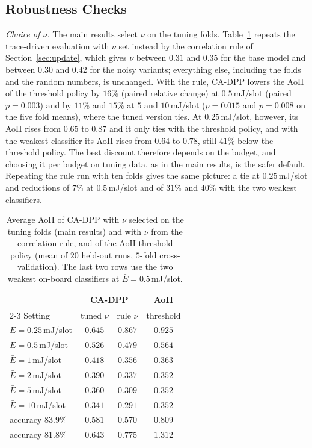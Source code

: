 \documentclass[5p,twocolumn]{elsarticle}
\theoremstyle{remark}
\begin{document}
\subsection{Robustness Checks}\label{res:robust}
\emph{Choice of $\nu$.} The main results select $\nu$ on the tuning folds. Table~\ref{tab:nu} repeats the trace-driven evaluation with $\nu$ set instead by the correlation rule of Section~\ref{sec:update}, which gives $\nu$ between $0.31$ and $0.35$ for the base model and between $0.30$ and $0.42$ for the noisy variants; everything else, including the folds and the random numbers, is unchanged. With the rule, CA-DPP lowers the AoII of the threshold policy by $16\%$ (paired relative change) at $0.5$\,mJ/slot (paired $p=0.003$) and by $11\%$ and $15\%$ at $5$ and $10$\,mJ/slot ($p=0.015$ and $p=0.008$ on the five fold means), where the tuned version ties. At $0.25$\,mJ/slot, however, its AoII rises from $0.65$ to $0.87$ and it only ties with the threshold policy, and with the weakest classifier its AoII rises from $0.64$ to $0.78$, still $41\%$ below the threshold policy. The best discount therefore depends on the budget, and choosing it per budget on tuning data, as in the main results, is the safer default. Repeating the rule run with ten folds gives the same picture: a tie at $0.25$\,mJ/slot and reductions of $7\%$ at $0.5$\,mJ/slot and of $31\%$ and $40\%$ with the two weakest classifiers.

\begin{table}[t]
\caption{Average AoII of CA-DPP with $\nu$ selected on the tuning folds (main results) and with $\nu$ from the correlation rule, and of the AoII-threshold policy (mean of $20$ held-out runs, $5$-fold cross-validation). The last two rows use the two weakest on-board classifiers at $\bar E=0.5$\,mJ/slot.}\label{tab:nu}
\centering\footnotesize
\begin{tabular}{@{}lccc@{}}
\toprule
 & \multicolumn{2}{c}{CA-DPP} & AoII\\
\cmidrule(lr){2-3}
Setting & tuned $\nu$ & rule $\nu$ & threshold\\
\midrule
$\bar E=0.25$\,mJ/slot & $0.645$ & $0.867$ & $0.925$\\
$\bar E=0.5$\,mJ/slot & $0.526$ & $0.479$ & $0.564$\\
$\bar E=1$\,mJ/slot & $0.418$ & $0.356$ & $0.363$\\
$\bar E=2$\,mJ/slot & $0.390$ & $0.337$ & $0.352$\\
$\bar E=5$\,mJ/slot & $0.360$ & $0.309$ & $0.352$\\
$\bar E=10$\,mJ/slot & $0.341$ & $0.291$ & $0.352$\\
accuracy $83.9\%$ & $0.581$ & $0.570$ & $0.809$\\
accuracy $81.8\%$ & $0.643$ & $0.775$ & $1.312$\\
\bottomrule
\end{tabular}
\end{table}
\end{document}
